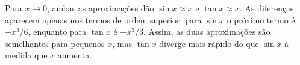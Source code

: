 Para $x\to0$, ambas as aproximações dão $\sin x\approx x$ e $\tan x\approx x$. As diferenças aparecem apenas nos termos de ordem superior: para $\sin x$ o próximo termo é $-x^{3}/6$, enquanto para $\tan x$ é $+x^{3}/3$. Assim, as duas aproximações são semelhantes para pequenos $x$, mas $\tan x$ diverge mais rápido do que $\sin x$ à medida que $x$ aumenta. 